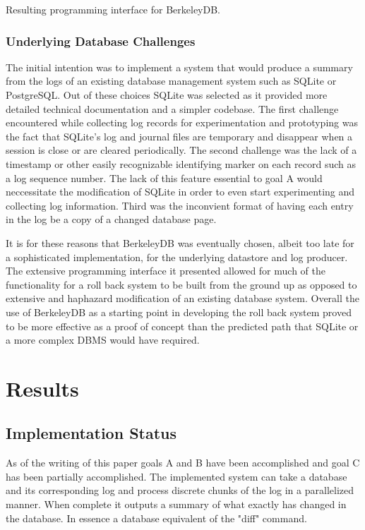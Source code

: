 \documentclass{article}
\begin{document}
Resulting programming interface for BerkeleyDB.

\subsubsection{Underlying Database Challenges}
The initial intention was to implement a system that would produce a summary from the logs of an existing database management system such as SQLite or PostgreSQL. Out of these choices SQLite was selected as it provided more detailed technical documentation and a simpler codebase. The first challenge encountered while collecting log records for experimentation and prototyping was the fact that SQLite's log and journal files are temporary and disappear when a session is close or are cleared periodically. The second challenge was the lack of a timestamp or other easily recognizable identifying marker on each record such as a log sequence number. The lack of this feature essential to goal A would neccessitate the modification of SQLite in order to even start experimenting and collecting log information. Third was the inconvient format of having each entry in the log be a copy of a changed database page. 

It is for these reasons that BerkeleyDB was eventually chosen, albeit too late for a sophisticated implementation, for the underlying datastore and log producer. The extensive programming interface it presented allowed for much of the functionality for a roll back system to be built from the ground up as opposed to extensive and haphazard modification of an existing database system. Overall the use of BerkeleyDB as a starting point in developing the roll back system proved to be more effective as a proof of concept than the predicted path that SQLite or a more complex DBMS would have required. 

\section{Results}
\subsection{Implementation Status}

As of the writing of this paper goals A and B have been accomplished and goal C has been partially accomplished. The implemented system can take a database and its corresponding log and process discrete chunks of the log in a parallelized manner. When complete it outputs a summary of what exactly has changed in the database. In essence a database equivalent of the "diff" command. 
\end{document}
